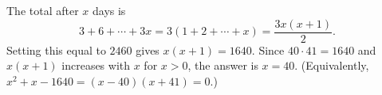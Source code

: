 The total after $x$ days is
\[3+6+\cdots+3x=3(1+2+\cdots+x)=\dfrac{3x(x+1)}{2}.\]
Setting this equal to $2460$ gives $x(x+1)=1640$. Since $40\cdot41=1640$ and $x(x+1)$ increases with $x$ for $x>0$, the answer is $x=\boxed{40}$. (Equivalently, $x^2+x-1640=(x-40)(x+41)=0$.)
